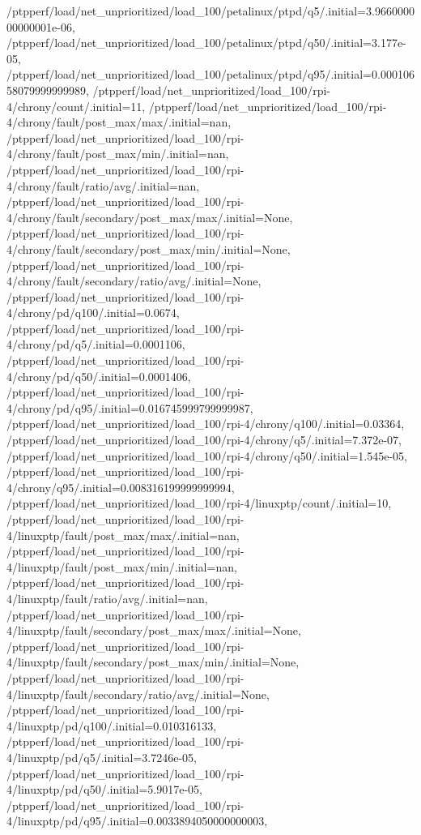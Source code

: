 {    /ptpperf/load/net_unprioritized/load_100/petalinux/ptpd/q5/.initial=3.966000000000001e-06,
    /ptpperf/load/net_unprioritized/load_100/petalinux/ptpd/q50/.initial=3.177e-05,
    /ptpperf/load/net_unprioritized/load_100/petalinux/ptpd/q95/.initial=0.00010658079999999989,
    /ptpperf/load/net_unprioritized/load_100/rpi-4/chrony/count/.initial=11,
    /ptpperf/load/net_unprioritized/load_100/rpi-4/chrony/fault/post_max/max/.initial=nan,
    /ptpperf/load/net_unprioritized/load_100/rpi-4/chrony/fault/post_max/min/.initial=nan,
    /ptpperf/load/net_unprioritized/load_100/rpi-4/chrony/fault/ratio/avg/.initial=nan,
    /ptpperf/load/net_unprioritized/load_100/rpi-4/chrony/fault/secondary/post_max/max/.initial=None,
    /ptpperf/load/net_unprioritized/load_100/rpi-4/chrony/fault/secondary/post_max/min/.initial=None,
    /ptpperf/load/net_unprioritized/load_100/rpi-4/chrony/fault/secondary/ratio/avg/.initial=None,
    /ptpperf/load/net_unprioritized/load_100/rpi-4/chrony/pd/q100/.initial=0.0674,
    /ptpperf/load/net_unprioritized/load_100/rpi-4/chrony/pd/q5/.initial=0.0001106,
    /ptpperf/load/net_unprioritized/load_100/rpi-4/chrony/pd/q50/.initial=0.0001406,
    /ptpperf/load/net_unprioritized/load_100/rpi-4/chrony/pd/q95/.initial=0.016745999799999987,
    /ptpperf/load/net_unprioritized/load_100/rpi-4/chrony/q100/.initial=0.03364,
    /ptpperf/load/net_unprioritized/load_100/rpi-4/chrony/q5/.initial=7.372e-07,
    /ptpperf/load/net_unprioritized/load_100/rpi-4/chrony/q50/.initial=1.545e-05,
    /ptpperf/load/net_unprioritized/load_100/rpi-4/chrony/q95/.initial=0.008316199999999994,
    /ptpperf/load/net_unprioritized/load_100/rpi-4/linuxptp/count/.initial=10,
    /ptpperf/load/net_unprioritized/load_100/rpi-4/linuxptp/fault/post_max/max/.initial=nan,
    /ptpperf/load/net_unprioritized/load_100/rpi-4/linuxptp/fault/post_max/min/.initial=nan,
    /ptpperf/load/net_unprioritized/load_100/rpi-4/linuxptp/fault/ratio/avg/.initial=nan,
    /ptpperf/load/net_unprioritized/load_100/rpi-4/linuxptp/fault/secondary/post_max/max/.initial=None,
    /ptpperf/load/net_unprioritized/load_100/rpi-4/linuxptp/fault/secondary/post_max/min/.initial=None,
    /ptpperf/load/net_unprioritized/load_100/rpi-4/linuxptp/fault/secondary/ratio/avg/.initial=None,
    /ptpperf/load/net_unprioritized/load_100/rpi-4/linuxptp/pd/q100/.initial=0.010316133,
    /ptpperf/load/net_unprioritized/load_100/rpi-4/linuxptp/pd/q5/.initial=3.7246e-05,
    /ptpperf/load/net_unprioritized/load_100/rpi-4/linuxptp/pd/q50/.initial=5.9017e-05,
    /ptpperf/load/net_unprioritized/load_100/rpi-4/linuxptp/pd/q95/.initial=0.0033894050000000003,
}
